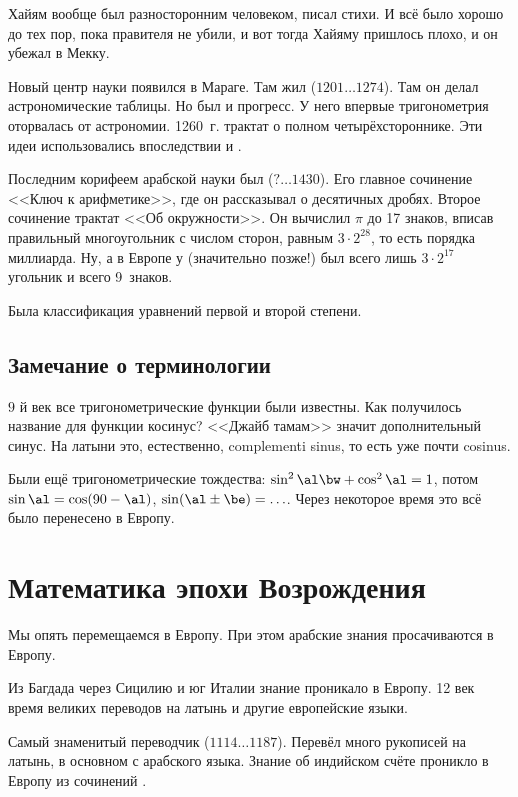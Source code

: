 \documentclass[a4paper,oneside,fleqn,10pt]{article}
\newcommand{\pe}[2]{${#1}\ldots{#2}$}
\begin{document}
Хайям вообще был разносторонним человеком, писал стихи.
И всё было хорошо до тех пор, пока правителя не убили, и вот тогда
Хайяму пришлось плохо, и он убежал в Мекку.

Новый центр науки появился в Мараге. Там жил  (\pe{1201}{1274}).
Там он делал астрономические таблицы.
Но был и прогресс. У него впервые тригонометрия оторвалась от астрономии.
1260~г. трактат о полном четырёхстороннике.
Эти идеи использовались впоследствии  и .

Последним корифеем арабской науки был  (\pe{?}{1430}).
Его главное сочинение <<Ключ к арифметике>>, где он рассказывал о десятичных дробях.
Второе сочинение трактат <<Об окружности>>. Он вычислил $\pi$ до 17 знаков, вписав
правильный многоугольник с числом сторон, равным $3\cdot 2^{28}$, то есть порядка миллиарда.
Ну, а в Европе у  (значительно позже!) был всего лишь $3\cdot 2^{17}$ угольник и всего 9~знаков.

Была классификация уравнений первой и второй степени.

\subsection{Замечание о терминологии}

$9$ й век все тригонометрические функции
были известны. Как получилось название для функции косинус?
<<Джайб тамам>> значит дополнительный
синус. На латыни это, естественно, complementi sinus, то есть
уже почти cosinus.

Были ещё тригонометрические тождества:
$\sin^2 \al \bw+ \cos^2\al = 1$, потом $\sin \al = \cos(90-\al)$, $\sin({\al \pm\be}) = \ldots$.
Через некоторое время это всё было перенесено в Европу.


\section{Математика эпохи Возрождения}

Мы опять перемещаемся в Европу. При этом арабские знания просачиваются в Европу.

Из Багдада через Сицилию и юг Италии знание проникало в Европу.
12 век время великих переводов на латынь и другие европейские языки.

Самый знаменитый переводчик  (\pe{1114}{1187}).
Перевёл много рукописей на латынь, в основном с арабского языка.
Знание об индийском счёте проникло в Европу из сочинений .
\end{document}
